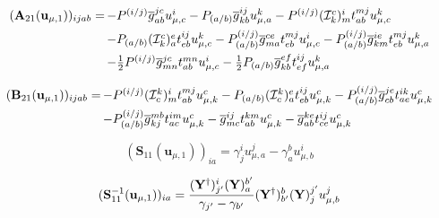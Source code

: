 \begin{subappendices}
\begin{equation}
    \begin{array}{r@{\,}l}
        (\mathbf{A}_{21}(\mathbf{u}_{\mu,1}))_{ijab}
        =
        &
        -
        P^{(i/j)}
        \overline{g}_{ab}^{jc}
        u_{\mu,c}^i
        -
        P_{(a/b)}
        \overline{g}_{kb}^{ij}
        u_{\mu,a}^k
        -
        P^{(i/j)}
        (\mathcal{I}_k^c)_m^i
        t_{ab}^{mj}
        u_{\mu,c}^k
        \\[5pt]
        &
        -
        P_{(a/b)}
        (\mathcal{I}_k^c)_a^e
        t_{eb}^{ij}
        u_{\mu,c}^k
        -
        P_{(a/b)}^{(i/j)}
        \overline{g}_{ma}^{ce}
        t_{eb}^{mj}
        u_{\mu,c}^i
        -
        P_{(a/b)}^{(i/j)}
        \overline{g}_{km}^{ie}
        t_{eb}^{mj}
        u_{\mu,a}^k
        \\[5pt]
        &
        -
        \tfrac{1}{2}
        P^{(i/j)}
        \overline{g}_{mn}^{jc}
        t_{ab}^{mn}
        u_{\mu,c}^i
        -
        \tfrac{1}{2}
        P_{(a/b)}
        \overline{g}_{kb}^{ef}
        t_{ef}^{ij}
        u_{\mu,a}^k
    \end{array}
\end{equation}

\begin{equation}
    \begin{array}{r@{\,}l}
        (\mathbf{B}_{21}(\mathbf{u}_{\mu,1}))_{ijab}
        =
        &
        -
        P^{(i/j)}
        (\mathcal{I}_c^k)_m^i
        t_{ab}^{mj}
        u_{\mu,k}^c
        -
        P_{(a/b)}
        (\mathcal{I}_c^k)_a^e
        t_{eb}^{ij}
        u_{\mu,k}^c
        -
        P_{(a/b)}^{(i/j)}
        \overline{g}_{cb}^{je}
        t_{ae}^{ik}
        u_{\mu,k}^c
        \\[5pt]
        &
        -
        P_{(a/b)}^{(i/j)}
        \overline{g}_{kj}^{mb}
        t_{ac}^{im}
        u_{\mu,k}^c
        -
        \overline{g}_{mc}^{ij}
        t_{ab}^{km}
        u_{\mu,k}^c
        -
        \overline{g}_{ab}^{ke}
        t_{ce}^{ij}
        u_{\mu,k}^c
    \end{array}
\end{equation}

\begin{equation}
    (\mathbf{S}_{11}(\mathbf{u}_{\mu,1}))_{ia}
    =
    \gamma^i_j
    u_{\mu,a}^j
    -
    \gamma^b_a
    u_{\mu,b}^i
\end{equation}

\begin{equation}
    (\mathbf{S}_{11}^{-1}(\mathbf{u}_{\mu,1}))_{ia}
    =
    \frac{%
        (\mathbf{Y}^\dagger)_{j'}^i
        (\mathbf{Y})_a^{b'}
    }{%
        \gamma_{j'}-\gamma_{b'}
    }
    (\mathbf{Y}^\dagger)_{b'}^b
    (\mathbf{Y})_j^{j'}
    u_{\mu,b}^j
\end{equation}


\end{subappendices}
